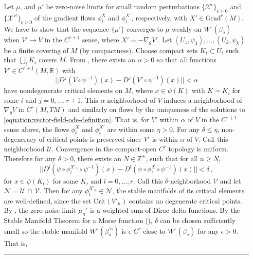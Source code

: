 \documentclass[12pt]{article}
\newcommand{\BlackBox}{\rule{1.5ex}{1.5ex}}  %
\renewenvironment{proof}{\par\noindent{\bf Proof\ }}{\hfill\BlackBox\\[2mm]}
\newenvironment{proof}{\par\noindent{\bf Proof\ }}{\hfill\BlackBox\\[2mm]}
\begin{document}
\begin{proof}
    Let $\mu$, and $\mu'$ be zero-noise limits for small random perturbations $\{ \mathcal{X^{\epsilon}}\}_{\epsilon >0}$ and $\{ \mathcal{X'^{\epsilon}}\}_{\epsilon >0}$ of the gradient flows $\phi_t^X$ and $\phi_t^{X'}$, respectively, with $X' \in \text{Grad}^r(M)$. We have to show that the sequence $\{\mu'\}$ converges to $\mu$ weakly on $W^s(\beta_a)$ when $V' \rightarrow V$ in the $C^{r+1}$ sense, where $X' = -\nabla_g V'$. Let $(U_1,\psi_1),...,(U_k,\psi_k)$ be a finite covering of $M$ (by compactness). Choose compact sets $K_i \subset U_i$ such that $\bigcup_i K_i$ covers $M$. From , there exists an $\alpha>0$ so that all 
    functions $V' \in C^{r+1}(M,\mathbb{R})$ with
    \begin{equation*}
        || D^j (V \circ \psi^{-1})(x) - D^j(V' \circ \psi^{-1})(x)|| < \alpha
    \end{equation*}
    have nondegenerate critical elements on $M$, where $x \in \psi(K)$ with $K = K_i$ for some $i$ and $j = 0,...,r+1$. This $\alpha$-neighborhood of $V$ induces a neighborhood of $\nabla_gV$ in $C^r(M,TM)$ and similarly on flows by the uniqueness of the solutions to \eqref{equation:vector-field-ode-definition}. That is, for $V'$ within $\alpha$ of $V$ in the $C^{r+1}$ sense above, the flows $\phi_t^X$ and $\phi_t^{X'}$ are within some $\eta >0$. For any $\delta \leq \eta$, non-degeneracy of critical points is preserved since $V'$ is within $\alpha$ of $V$. Call this neighborhood $\mathcal{U}$. Convergence in the compact-open $C^r$ topology is uniform. Therefore for any $\delta>0$, there exists an $N \in \mathbb{Z}^{+}$, such that for all $n \geq N$,
    \begin{equation*}
        || D^l (\psi \circ \phi_t^{X'_{n}} \circ \psi^{-1})(x) - D^l (\psi \circ \phi_t^{X} \circ \psi^{-1})(x) || < \delta \, ,
    \end{equation*}
    for $x \in \psi(K_i)$ for some $K_i$ and $l=0,...,r$. Call this $\delta$-neighborhood $\mathcal{V}$ and let $\mathcal{N = \mathcal{U} \, \cap \, \mathcal{V}}$. Then for any $\phi_t^{X'_{n}}\in \mathcal{N}$, the stable manifolds of its critical elements are well-defined, since the set $\text{Crit}(V'_{n})$ contains no degenerate critical points. By , the zero-noise limit $\mu_n'$ is a weighted sum of Dirac delta functions. By the Stable Manifold Theorem for a Morse function (), $\delta$ can be chosen sufficiently small so the stable manifold $W^s(\beta_a^{'n})$ is $\epsilon$-$C^r$ close to $W^s(\beta_a)$ for any $\epsilon > 0$. That is,

\end{proof}
\end{document}
